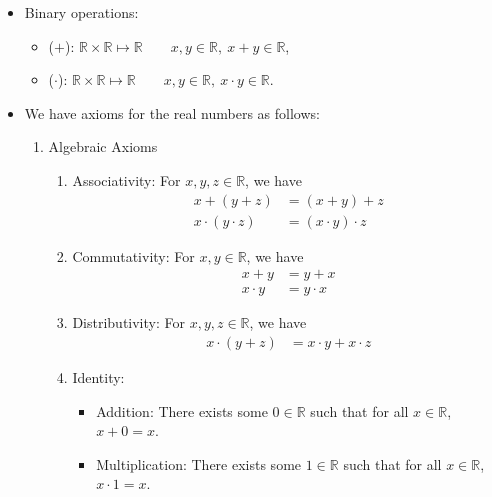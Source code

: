 \documentclass{article}
\newcommand{\R}{\mathbb{R}}
\newcommand{\?}{\stackrel{?}{=}}
\newcommand{\smallblacksquare}{\rule{0.5em}{0.5em}}
\theoremstyle{definition} %
\begin{document}
\begin{itemize}
    \item Binary operations:
          \begin{itemize}[label=$\smallblacksquare$]
              \item ($+$): $\R \times \R \mapsto \R \qquad x, y \in \R, \ x + y \in \R$,
              \item ($\cdot$): $\R \times \R \mapsto \R \qquad x, y \in \R, \ x \cdot y \in \R$.
          \end{itemize}
    \item We have axioms for the real numbers as follows:
          \begin{enumerate}[label=\Roman*]
              \item Algebraic Axioms
                    \begin{enumerate}[label=(\roman*)]
                        \item Associativity: For $x, y, z \in \R$, we have
                              \begin{align*}
                                  x + (y + z)         & = (x + y) + z         \\
                                  x \cdot (y \cdot z) & = (x \cdot y) \cdot z
                              \end{align*}
                        \item Commutativity: For $x, y \in \R$, we have
                              \begin{align*}
                                  x + y     & = y + x     \\
                                  x \cdot y & = y \cdot x
                              \end{align*}
                        \item Distributivity: For $x, y, z \in \R$, we have
                              \begin{align*}
                                  x \cdot (y + z) & = x \cdot y + x \cdot z
                              \end{align*}
                        \item Identity:
                              \begin{itemize}[label=$\smallblacksquare$]
                                  \item Addition: There exists some $0 \in \R$ such that for all $x \in \R$, $x + 0 = x$.
                                  \item Multiplication: There exists some $1 \in \R$ such that for all $x \in \R$, $x \cdot 1 = x$.

\end{itemize}
\end{enumerate}
\end{enumerate}
\end{itemize}
\end{document}
